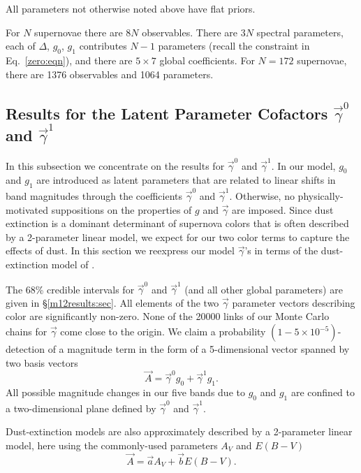 \documentclass[trackchanges]{aastex62}   	%
\begin{document}
All parameters not  otherwise noted above have flat priors.

For $N$ supernovae there are $8N$ observables.  There are $3N$ spectral parameters, each of
$\Delta$, $g_0$, $g_1$ contributes $N-1$ parameters
(recall the constraint in Eq.~\ref{zero:eqn}),  and there are $5 \times 7$ global coefficients.
For $N=172$ supernovae, there are 1376 observables and 1064  parameters.


\subsection{Results for the Latent Parameter Cofactors  $\vec{\gamma}^0$ and $\vec{\gamma}^1$  }
\label{results1:sec}
In this subsection we concentrate on the results for $\vec{\gamma}^0$ and $\vec{\gamma}^1$.
In our model, $g_0$ and $g_1$ are introduced as latent parameters that are related to linear shifts in band magnitudes through
the  coefficients $\vec{\gamma}^0$ and
$\vec{\gamma}^1$.  Otherwise, no physically-motivated suppositions on the properties of $g$ and $\vec{\gamma}$ are imposed.
Since dust extinction is a dominant determinant of supernova colors that is often described by a 2-parameter linear model, we expect
for our two  color terms to capture the effects of dust.
In this section we reexpress our model $\vec{\gamma}$'s in terms of
the dust-extinction model of \citet{1999PASP..111...63F} .

The 68\% credible intervals for $\vec{\gamma}^0$ and $\vec{\gamma}^1$ (and all other global parameters) are given in \S\ref{m12results:sec}.
All elements of the two $\vec{\gamma}$ parameter vectors 
describing color
are significantly non-zero.
None of the 20000 links of 
our Monte Carlo chains for $\vec{\gamma}$ come close to the origin.   We claim 
a probability $(1-5\times 10^{-5})$-detection of
a magnitude term in the form of a 5-dimensional vector spanned by two basis vectors
\begin{equation}
\vec{A} = \vec{\gamma}^0 g_0 +  \vec{\gamma}^1 g_1.
\end{equation}
All possible magnitude changes in our five bands due to $g_0$ and $g_1$ are confined to a two-dimensional
plane defined by $\vec{\gamma}^0$ and  $\vec{\gamma}^1$. 

Dust-extinction
models are also approximately described by a 2-parameter linear model, here 
using the commonly-used parameters $A_V$ and $E(B-V)$
\begin{equation}
\vec{A} =\vec{ a}  A_{V} + \vec{b} E(B-V).
\label{f99:eqn}
\end{equation}
\end{document}
